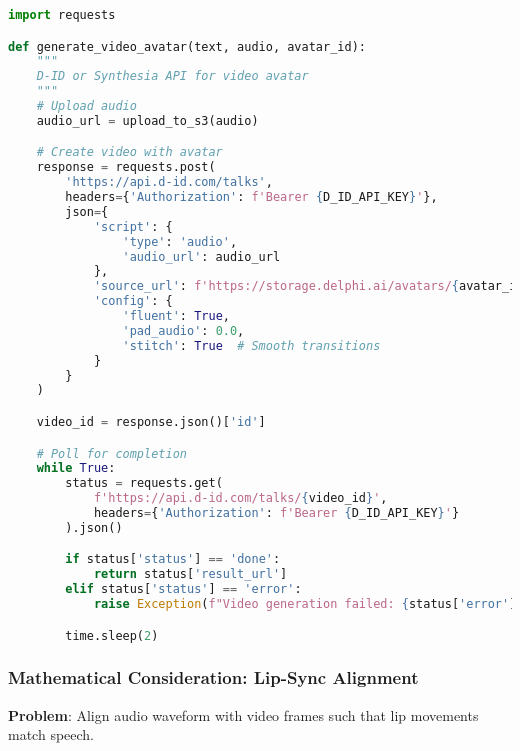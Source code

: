 \documentclass[10pt]{article}
\begin{document}
\begin{lstlisting}[language=Python]
import requests

def generate_video_avatar(text, audio, avatar_id):
    """
    D-ID or Synthesia API for video avatar
    """
    # Upload audio
    audio_url = upload_to_s3(audio)

    # Create video with avatar
    response = requests.post(
        'https://api.d-id.com/talks',
        headers={'Authorization': f'Bearer {D_ID_API_KEY}'},
        json={
            'script': {
                'type': 'audio',
                'audio_url': audio_url
            },
            'source_url': f'https://storage.delphi.ai/avatars/{avatar_id}.jpg',
            'config': {
                'fluent': True,
                'pad_audio': 0.0,
                'stitch': True  # Smooth transitions
            }
        }
    )

    video_id = response.json()['id']

    # Poll for completion
    while True:
        status = requests.get(
            f'https://api.d-id.com/talks/{video_id}',
            headers={'Authorization': f'Bearer {D_ID_API_KEY}'}
        ).json()

        if status['status'] == 'done':
            return status['result_url']
        elif status['status'] == 'error':
            raise Exception(f"Video generation failed: {status['error']}")

        time.sleep(2)
\end{lstlisting}

\subsubsection{Mathematical Consideration: Lip-Sync Alignment}

\textbf{Problem}: Align audio waveform with video frames such that lip movements match speech.
\end{document}
